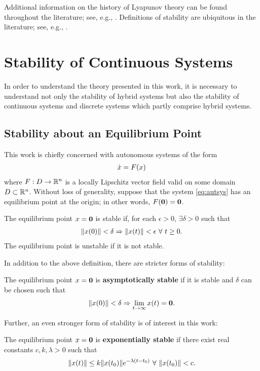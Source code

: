 Additional information on the history of Lyapunov theory can be found throughout
the literature; see, e.g., \cite{Michel2007,Teel1999}.
%
Definitions of stability are ubiquitous in the literature; see, e.g.,
\cite{Khalil2002,Teschl2012,Vidyasagar1993}.

\section{Stability of Continuous Systems}

In order to understand the theory presented in this work, it is necessary to
understand not only the stability of hybrid systems but also the stability of
continuous systems and discrete systems which partly comprise hybrid systems.
%

\subsection{Stability about an Equilibrium Point}
This work is chiefly concerned with autonomous systems of the form
\begin{align}
  \label{eq:autsys}
  {\dot {x}} = F(x)
\end{align}
where $F : D \to \mathbb{R}^{n}$ is a locally Lipschitz vector field valid on some domain
$D \subset \mathbb{R}^{n}$.
%
Without loss of generality, suppose that the system \eqref{eq:autsys} has an equilibrium point at the
origin;
%
in other words, $F({\mathbf 0}) = {\mathbf 0}$.
%
\begin{definition}
  The equilibrium point $x = {\mathbf 0}$ is stable if, for each $\epsilon > 0$,
  $\exists \delta > 0$ such that
  \begin{align*}
    \|x(0)\| < \delta \Rightarrow \|x(t)\| < \epsilon \ \forall \ t
    \geq 0.
  \end{align*}
  The equilibrium point is unstable if it is not stable.
\end{definition}

In addition to the above definition, there are stricter forms of stability:
\begin{definition}
  The equilibrium point $x = {\mathbf 0}$ is {\bf asymptotically stable} if it is
  stable and $\delta$ can be chosen such that
  \begin{align*}
    \|x(0)\| < \delta \Rightarrow \lim_{t \to \infty} x(t) = {\mathbf 0}.
  \end{align*}
\end{definition}

Further, an even stronger form of stability is of interest in this work:
\begin{definition}
  The equilibrium point $x = {\mathbf 0}$ is {\bf exponentially stable} if there
  exist real constants $c, k, \lambda > 0$ such that
  \begin{align*}
    \nxt \leq k \nxtnaught e^{-\lambda (t - t_{0})} \ \forall \ \nxtnaught
    < c.
  \end{align*}
\end{definition}


